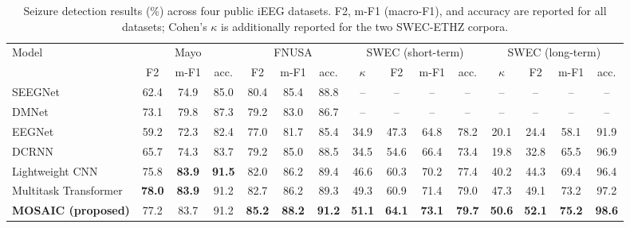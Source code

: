 \documentclass[letterpaper]{article}
\begin{document}
\begin{table}[!t]
\centering
\caption{Seizure detection results (\%) across four public iEEG datasets.
F2, m-F1 (macro-F1), and accuracy are reported for all datasets; Cohen's
$\kappa$ is additionally reported for the two SWEC-ETHZ corpora.}
\label{tab:results}
\small
\setlength{\tabcolsep}{2pt}
\begin{tabular*}{\textwidth}{@{\extracolsep{\fill}}lcccccccccccccc}
\toprule
\multirow{2}{*}{Model} & \multicolumn{3}{c}{Mayo} & \multicolumn{3}{c}{FNUSA} & \multicolumn{4}{c}{SWEC (short-term)} & \multicolumn{4}{c}{SWEC (long-term)} \\
\cmidrule(lr){2-4} \cmidrule(lr){5-7} \cmidrule(lr){8-11} \cmidrule(lr){12-15}
 & F2 & m-F1 & acc. & F2 & m-F1 & acc. & $\kappa$ & F2 & m-F1 & acc. & $\kappa$ & F2 & m-F1 & acc. \\
\midrule
SEEGNet              & 62.4          & 74.9          & 85.0          & 80.4          & 85.4          & 88.8          & --            & --            & --            & --            & --            & --            & --            & --            \\
DMNet                & 73.1          & 79.8          & 87.3          & 79.2          & 83.0          & 86.7          & --            & --            & --            & --            & --            & --            & --            & --            \\
EEGNet               & 59.2          & 72.3          & 82.4          & 77.0          & 81.7          & 85.4          & 34.9          & 47.3          & 64.8          & 78.2          & 20.1          & 24.4          & 58.1          & 91.9          \\
DCRNN                & 65.7          & 74.3          & 83.7          & 79.2          & 85.0          & 88.5          & 34.5          & 54.6          & 66.4          & 73.4          & 19.8          & 32.8          & 65.5          & 96.9          \\
Lightweight CNN      & 75.8          & \textbf{83.9} & \textbf{91.5} & 82.0          & 86.2          & 89.4          & 46.6          & 60.3          & 70.2          & 77.4          & 40.2          & 44.3          & 69.4          & 96.4          \\
Multitask Transformer & \textbf{78.0} & \textbf{83.9} & 91.2          & 82.7          & 86.2          & 89.3          & 49.3          & 60.9          & 71.4          & 79.0          & 47.3          & 49.1          & 73.2          & 97.2          \\
\textbf{MOSAIC (proposed)} & 77.2 & 83.7          & 91.2          & \textbf{85.2} & \textbf{88.2} & \textbf{91.2} & \textbf{51.1} & \textbf{64.1} & \textbf{73.1} & \textbf{79.7} & \textbf{50.6} & \textbf{52.1} & \textbf{75.2} & \textbf{98.6} \\
\bottomrule
\end{tabular*}
\end{table}
\end{document}
